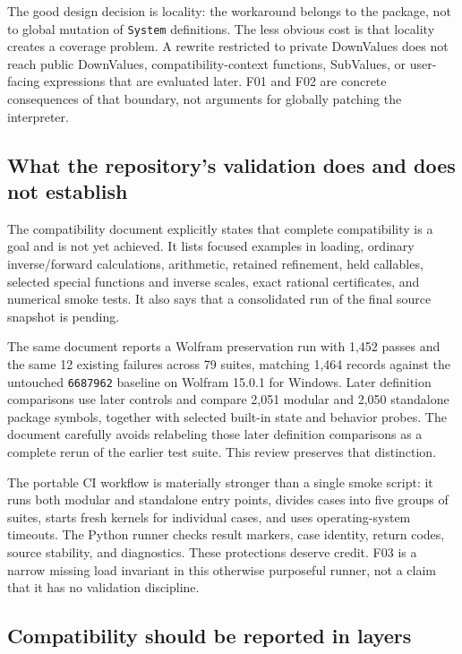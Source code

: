 \documentclass[11pt,letterpaper]{article}
\newcommand{\code}[1]{\texttt{#1}}
\begin{document}
The good design decision is locality: the workaround belongs to the package, not to global mutation of \code{System} definitions. The less obvious cost is that locality creates a coverage problem. A rewrite restricted to private DownValues does not reach public DownValues, compatibility-context functions, SubValues, or user-facing expressions that are evaluated later. F01 and F02 are concrete consequences of that boundary, not arguments for globally patching the interpreter.

\subsection{What the repository's validation does and does not establish}

The compatibility document explicitly states that complete compatibility is a goal and is not yet achieved. It lists focused examples in loading, ordinary inverse/forward calculations, arithmetic, retained refinement, held callables, selected special functions and inverse scales, exact rational certificates, and numerical smoke tests. It also says that a consolidated run of the final source snapshot is pending.~\cite{compat}

The same document reports a Wolfram preservation run with 1,452 passes and the same 12 existing failures across 79 suites, matching 1,464 records against the untouched \code{6687962} baseline on Wolfram 15.0.1 for Windows. Later definition comparisons use later controls and compare 2,051 modular and 2,050 standalone package symbols, together with selected built-in state and behavior probes. The document carefully avoids relabeling those later definition comparisons as a complete rerun of the earlier test suite. This review preserves that distinction.~\cite{compat}

The portable CI workflow is materially stronger than a single smoke script: it runs both modular and standalone entry points, divides cases into five groups of suites, starts fresh kernels for individual cases, and uses operating-system timeouts. The Python runner checks result markers, case identity, return codes, source stability, and diagnostics. These protections deserve credit. F03 is a narrow missing load invariant in this otherwise purposeful runner, not a claim that it has no validation discipline.~\cite{workflow,runner,portable}

\subsection{Compatibility should be reported in layers}
\end{document}
